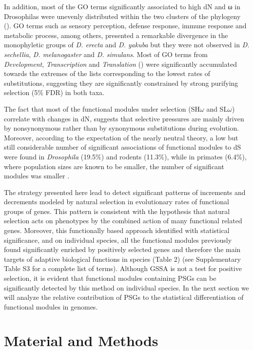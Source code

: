 In addition, most of the GO terms significantly associated to high dN and ω in Drosophilas were unevenly distributed within the two clusters of the phylogeny (). GO terms such as sensory perception, defense response, immune response and metabolic process, among others, presented a remarkable divergence in the monophyletic groups of \textit{D. erecta} and \textit{D. yakuba} but they were not observed in \textit{D. sechellia}, \textit{D. melanogaster} and \textit{D. simulans}. Most of GO terms from \textit{Development}, \textit{Transcription} and \textit{Translation} () were significantly accumulated towards the extremes of the lists corresponding to the lowest rates of substitutions, suggesting they are significantly constrained by strong purifying selection (5\% FDR) in both taxa.

The fact that most of the functional modules under selection (SH$\omega$ and SL$\omega$) correlate with changes in dN, suggests that selective pressures are mainly driven by nonsynonymous rather than by synonymous substitutions during evolution. Moreover, according to the expectation of the nearly neutral theory, a low but still considerable number of significant associations of functional modules to dS were found in \textit{Drosophila} (19.5\%) and rodents (11.3\%), while in primates (6.4\%), where population sizes are known to be smaller, the number of significant modules was smaller \cite{Petit2009}.

The strategy presented here lead to detect significant patterns of increments and decrements modeled by natural selection in evolutionary rates of functional groups of genes. This pattern is consistent with the hypothesis that natural selection acts on phenotypes by the combined action of many functional related genes. Moreover, this functionally based approach identified with statistical significance, and on individual species, all the functional modules previously found significantly enriched by positively selected genes and therefore the main targets of adaptive biological functions in species (Table 2) (see Supplementary Table S3 for a complete list of terms). Although GSSA is not a test for positive selection, it is evident that functional modules containing PSGs can be significantly detected by this method on individual species. In the next section we will analyze the relative contribution of PSGs to the statistical differentiation of functional modules in genomes.

\section{Material and Methods}
\label{sec:gssa_mat-met}
